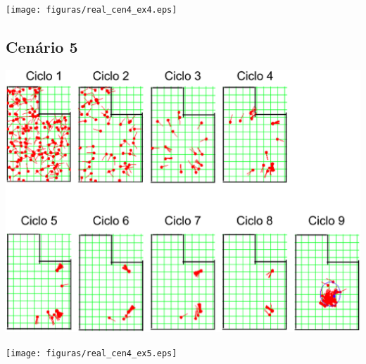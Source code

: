 {\centering
\texttt{[image: figuras/real\_cen4\_ex4.eps]}
\label{img:real_cen4_ex4}
\par}

\subsection{Cenário 5}

{\centering
\includegraphics[scale=0.4]{figuras/cen4_ex5.eps}
\label{img:cen4_ex5}
\par}

{\centering
\texttt{[image: figuras/real\_cen4\_ex5.eps]}
\label{img:real_cen4_ex5}
\par}
